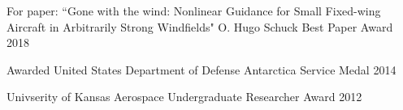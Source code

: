 
\begin{cvhonors}
  \cvhonor
    {For paper: ``Gone with the wind: Nonlinear Guidance for Small Fixed-wing Aircraft in Arbitrarily Strong Windfields"} %
    {O. Hugo Schuck Best Paper Award \quad{}} %
    {} %
    {2018} %

  \cvhonor
    {} %
    {Awarded United States Department of Defense Antarctica Service Medal} %
    {} %
    {2014} %

%

  \cvhonor
    {} %
    {Univserity of Kansas Aerospace Undergraduate Researcher Award} %
    {} %
    {2012} %

\end{cvhonors}
